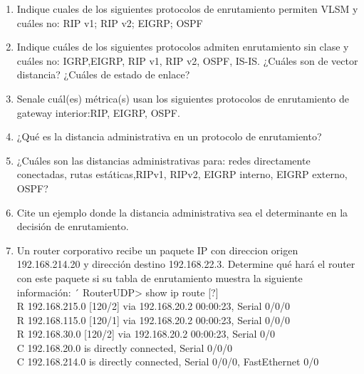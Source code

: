 \documentclass{udparticle}
\begin{document}
\begin{enumerate}
\item Indique cuales de los siguientes protocolos de enrutamiento permiten VLSM y 
cuáles no: RIP v1; RIP v2; EIGRP; OSPF
\item Indique cuáles de los siguientes protocolos admiten enrutamiento sin clase y 
cuáles no: IGRP,EIGRP, RIP v1, RIP v2, OSPF, IS-IS. ¿Cuáles son de vector 
distancia? ¿Cuáles de estado de enlace?
\item Senale cuál(es) métrica(s) usan los siguientes protocolos de enrutamiento de gateway interior:RIP, EIGRP, OSPF.
\item ¿Qué es la distancia administrativa en un protocolo de enrutamiento?
\item ¿Cuáles son las distancias administrativas para: redes directamente conectadas, rutas estáticas,RIPv1, RIPv2, EIGRP interno, EIGRP externo, OSPF?
\item Cite un ejemplo donde la distancia administrativa sea el determinante en la decisión de enrutamiento.
\item Un router corporativo recibe un paquete IP con direccion origen 
192.168.214.20 y dirección destino 192.168.22.3. Determine qué hará el router con este paquete si su tabla de enrutamiento muestra la siguiente información: ´
RouterUDP> show ip route [?]\\
R 192.168.215.0 [120/2] via 192.168.20.2 00:00:23, Serial 0/0/0\\
R 192.168.115.0 [120/1] via 192.168.20.2 00:00:23, Serial 0/0/0\\
R 192.168.30.0 [120/2] via 192.168.20.2 00:00:23, Serial 0/0\\
C 192.168.20.0 is directly connected, Serial 0/0/0\\
C 192.168.214.0 is directly connected, Serial 0/0/0, FastEthernet 0/0\\


\end{enumerate}
\end{document}
